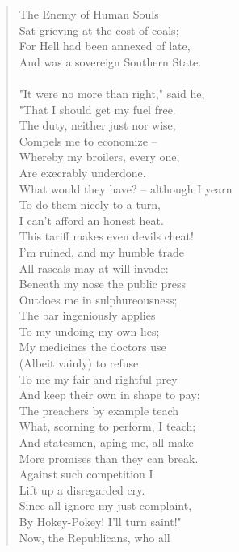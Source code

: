 \documentclass[11pt]{article}
\begin{document}
\begin{quote}   The Enemy of Human Souls \\
  Sat grieving at the cost of coals; \\
  For Hell had been annexed of late, \\
  And was a sovereign Southern State. \\
 \\
  "It were no more than right," said he, \\
  "That I should get my fuel free. \\
  The duty, neither just nor wise, \\
  Compels me to economize -- \\
  Whereby my broilers, every one, \\
  Are execrably underdone. \\
  What would they have? -- although I yearn \\
  To do them nicely to a turn, \\
  I can't afford an honest heat. \\
  This tariff makes even devils cheat! \\
  I'm ruined, and my humble trade \\
  All rascals may at will invade: \\
  Beneath my nose the public press \\
  Outdoes me in sulphureousness; \\
  The bar ingeniously applies \\
  To my undoing my own lies; \\
  My medicines the doctors use \\
  (Albeit vainly) to refuse \\
  To me my fair and rightful prey \\
  And keep their own in shape to pay; \\
  The preachers by example teach \\
  What, scorning to perform, I teach; \\
  And statesmen, aping me, all make \\
  More promises than they can break. \\
  Against such competition I \\
  Lift up a disregarded cry. \\
  Since all ignore my just complaint, \\
  By Hokey-Pokey!  I'll turn saint!" \\
  Now, the Republicans, who all \\

\end{quote}
\end{document}
